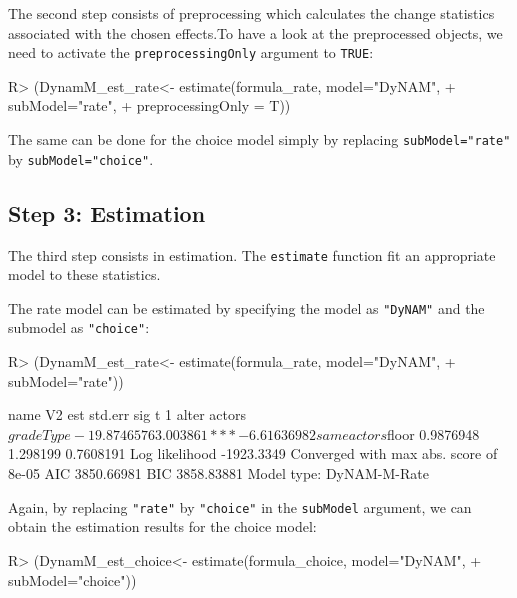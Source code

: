 \documentclass[article]{jss}
\begin{document}
The second step consists of preprocessing which calculates the change statistics associated with the chosen effects.To have a look at the preprocessed objects, we need to activate the \texttt{preprocessingOnly} argument to \texttt{TRUE}:
%
\begin{Schunk}
\begin{Sinput}
R> (DynamM_est_rate<- estimate(formula_rate, model="DyNAM", 
+                              subModel="rate",
+                              preprocessingOnly = T))
\end{Sinput}
\end{Schunk}
%
The same can be done for the choice model simply by replacing \texttt{subModel="rate"} by \texttt{subModel="choice"}.


\subsection[Step 3: Estimation]{Step 3: Estimation} \label{subsec:preprocess}

The third step consists in estimation. The \texttt{estimate} function fit an appropriate model to these statistics.

The rate model can be estimated by specifying the model as \texttt{"DyNAM"} and the submodel as \texttt{"choice"}:

%
\begin{Schunk}
\begin{Sinput}
R> (DynamM_est_rate<- estimate(formula_rate, model="DyNAM", 
+                              subModel="rate"))
\end{Sinput}
\end{Schunk}

%
\begin{Schunk}
\begin{Soutput}
   name               V2         est  std.err sig          t
1 alter actors$gradeType -19.8746576 3.003861 *** -6.6163698
2  same     actors$floor   0.9876948 1.298199      0.7608191
  Log likelihood -1923.3349 
  Converged with max abs. score of 8e-05 
  AIC  3850.66981 
  BIC  3858.83881 
  Model type: DyNAM-M-Rate 
\end{Soutput}
\end{Schunk}


Again, by replacing \texttt{"rate"} by \texttt{"choice"} in the \texttt{subModel} argument, we can obtain the estimation results for the choice model: 

\begin{Schunk}
\begin{Sinput}
R> (DynamM_est_choice<- estimate(formula_choice, model="DyNAM", 
+                                subModel="choice"))
\end{Sinput}
\end{Schunk}
\end{document}
